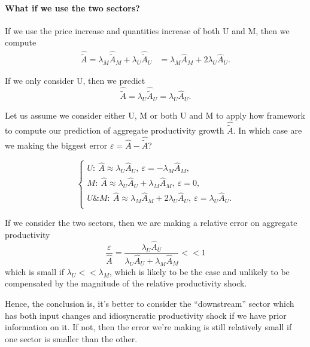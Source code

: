 \documentclass[11pt]{article}
\begin{document}
\paragraph{What if we use the two sectors?}
If we use the price increase and quantities increase of both U and M, then we compute
\begin{align*}
 \hat{\tilde{A}}=\lambda_M  \hat{\tilde{A}}_M +  \lambda_U  \hat{\tilde{A}}_U 
    &=
    \lambda_M  \hat{A}_M +  2\lambda_U  \hat{A}_U.
\end{align*}

If we only consider U, then we predict
\begin{equation*}
 \hat{\tilde{A}}=  \lambda_U  \hat{\tilde{A}}_U= \lambda_U  \hat{A}_U.
\end{equation*}

Let us assume we consider either U, M or both U and M to apply how framework to compute our prediction of aggregate productivity growth $\hat{\tilde{A}}$. In which case are we making the biggest error $\varepsilon=\hat{A}-\hat{\tilde{A}}$?

\begin{equation}
\begin{cases}
    U:~ \hat{A} \approx  \lambda_U  \hat{A}_U, ~\varepsilon= -\lambda_M  \hat{A}_M,\\
      M:~ \hat{A} \approx  \lambda_U \hat{A}_U+\lambda_M \hat{A}_M , ~\varepsilon= 0,\\
        U\&M:~ \hat{A} \approx  \lambda_M  \hat{A}_M +  2\lambda_U  \hat{A}_U , ~\varepsilon= \lambda_U  \hat{A}_U.\\
\end{cases}
\end{equation}

If we consider the two sectors, then we are making a relative error on aggregate productivity 
\begin{equation*}
   \frac{\varepsilon}{\hat{A}}= \frac{\lambda_U  \hat{A}_U}{ \lambda_U \hat{A}_U+\lambda_M \hat{A}_M}<<1
\end{equation*}
which is small if $\lambda_U<<\lambda_M$, which is likely to be the case and unlikely to be compensated by the magnitude of the relative productivity shock.

Hence, the conclusion is, it's better to consider the ``downstream'' sector which has both input changes and idiosyncratic productivity shock if we have prior information on it. If not, then the error we're making is still relatively small if one sector is smaller than the other.
\end{document}
